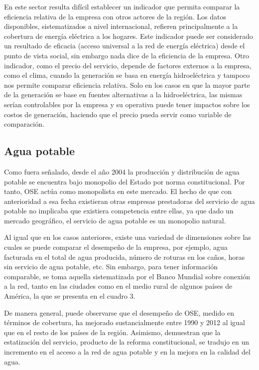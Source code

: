 \documentclass[
  12pt,
  spanish,
]{book}
\begin{document}
En este sector resulta difícil establecer un indicador que permita
comparar la eficiencia relativa de la empresa con otros actores de la
región. Los datos disponibles, sistematizados a nivel internacional,
refieren principalmente a la cobertura de energía eléctrica a los
hogares. Este indicador puede ser considerado un resultado de eficacia
(acceso universal a la red de energía eléctrica) desde el punto de vista
social, sin embargo nada dice de la eficiencia de la empresa. Otro
indicador, como el precio del servicio, depende de factores externos a
la empresa, como el clima, cuando la generación se basa en energía
hidroeléctrica y tampoco nos permite comparar eficiencia relativa. Solo
en los casos en que la mayor parte de la generación se base en fuentes
alternativas a la hidroeléctrica, las mismas serían controlables por la
empresa y su operativa puede tener impactos sobre los costos de
generación, haciendo que el precio pueda servir como variable de
comparación.

\hypertarget{agua-potable}{%
\subsection{Agua potable}\label{agua-potable}}

Como fuera señalado, desde el año 2004 la producción y distribución de
agua potable se encuentra bajo monopolio del Estado por norma
constitucional. Por tanto, OSE actúa como monopolista en este mercado.
El hecho de que con anterioridad a esa fecha existieran otras empresas
prestadoras del servicio de agua potable no implicaba que existiera
competencia entre ellas, ya que dado un mercado geográfico, el servicio
de agua potable es un monopolio natural.

Al igual que en los casos anteriores, existe una variedad de dimensiones
sobre las cuales se puede comparar el desempeño de la empresa, por
ejemplo, agua facturada en el total de agua producida, número de roturas
en los caños, horas sin servicio de agua potable, etc. Sin embargo, para
tener información comparable, se toma aquella sistematizada por el Banco
Mundial sobre conexión a la red, tanto en las ciudades como en el medio
rural de algunos países de América, la que se presenta en el cuadro 3.

De manera general, puede observarse que el desempeño de OSE, medido en
términos de cobertura, ha mejorado sustancialmente entre 1990 y 2012 al
igual que en el resto de los países de la región. Asimismo,
\citet{Borraz2013} demuestran que la estatización del servicio, producto
de la reforma constitucional, se tradujo en un incremento en el acceso a
la red de agua potable y en la mejora en la calidad del agua.
\end{document}

